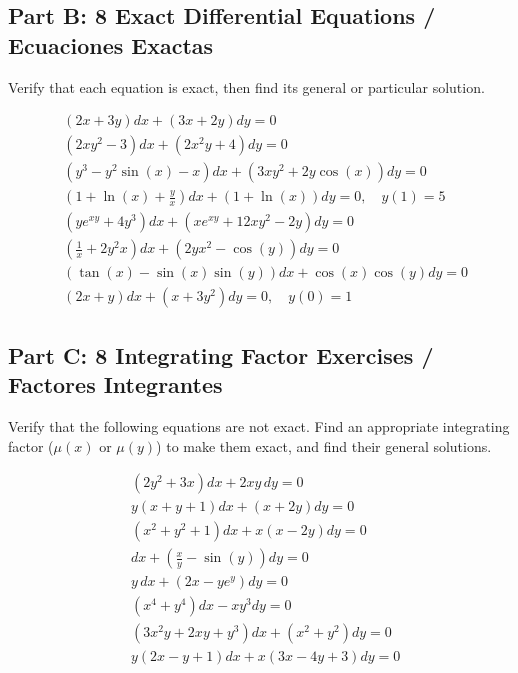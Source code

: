 \documentclass[11pt,letterpaper]{article}
\begin{document}
\subsection*{Part B: 8 Exact Differential Equations / Ecuaciones Exactas}
Verify that each equation is exact, then find its general or particular solution.

\begin{align}
    & (2x + 3y)dx + (3x + 2y)dy = 0 \label{eq:ext1} \\
    & (2xy^2 - 3)dx + (2x^2y + 4)dy = 0 \label{eq:ext2} \\
    & (y^3 - y^2\sin(x) - x)dx + (3xy^2 + 2y\cos(x))dy = 0 \label{eq:ext3} \\
    & \left(1 + \ln(x) + \frac{y}{x}\right)dx + \left(1 + \ln(x)\right)dy = 0, \quad y(1) = 5 \label{eq:ext4} \\
    & \left(y e^{xy} + 4y^3\right)dx + \left(x e^{xy} + 12xy^2 - 2y\right)dy = 0 \label{eq:ext5} \\
    & \left(\frac{1}{x} + 2y^2 x\right)dx + \left(2y x^2 - \cos(y)\right)dy = 0 \label{eq:ext6} \\
    & \left(\tan(x) - \sin(x)\sin(y)\right)dx + \cos(x)\cos(y)dy = 0 \label{eq:ext7} \\
    & (2x + y)dx + (x + 3y^2)dy = 0, \quad y(0) = 1 \label{eq:ext8}
\end{align}

\subsection*{Part C: 8 Integrating Factor Exercises / Factores Integrantes}
Verify that the following equations are not exact. Find an appropriate integrating factor ($\mu(x)$ or $\mu(y)$) to make them exact, and find their general solutions.

\begin{align}
    & (2y^2 + 3x)dx + 2xy\,dy = 0 \label{eq:inf1} \\
    & y(x + y + 1)dx + (x + 2y)dy = 0 \label{eq:inf2} \\
    & (x^2 + y^2 + 1)dx + x(x - 2y)dy = 0 \label{eq:inf3} \\
    & dx + \left(\frac{x}{y} - \sin(y)\right)dy = 0 \label{eq:inf4} \\
    & y\,dx + (2x - y e^y)dy = 0 \label{eq:inf5} \\
    & (x^4 + y^4)dx - x y^3 dy = 0 \label{eq:inf6} \\
    & \left(3x^2y + 2xy + y^3\right)dx + \left(x^2 + y^2\right)dy = 0 \label{eq:inf7} \\
    & y(2x-y+1)dx + x(3x-4y+3)dy = 0 \label{eq:inf8}
\end{align}
\end{document}

